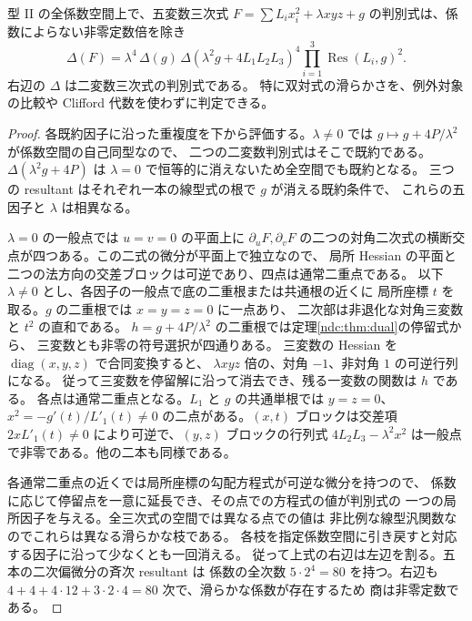 \begin{proposition}[三様体の判別式の引戻し]\label{ndc:prop:discriminant}
型 II の全係数空間上で、五変数三次式 $F=\sum L_i x_i^2+\lambda xyz+g$
の判別式は、係数によらない非零定数倍を除き
\[
 \Delta(F)=\lambda^4\,\Delta(g)\,
       \Delta(\lambda^2 g+4L_1L_2L_3)^4
       \prod_{i=1}^3\operatorname{Res}(L_i,g)^2 .
\]
右辺の $\Delta$ は二変数三次式の判別式である。
特に双対式の滑らかさを、例外対象の比較や Clifford 代数を使わずに判定できる。
\end{proposition}
\begin{proof}
各既約因子に沿った重複度を下から評価する。$\lambda\ne0$ では
$g\mapsto g+4P/\lambda^2$ が係数空間の自己同型なので、
二つの二変数判別式はそこで既約である。$\Delta(\lambda^2g+4P)$ は
$\lambda=0$ で恒等的に消えないため全空間でも既約となる。
三つの resultant はそれぞれ一本の線型式の根で $g$ が消える既約条件で、
これらの五因子と $\lambda$ は相異なる。

$\lambda=0$ の一般点では $u=v=0$ の平面上に $\partial_uF,\partial_vF$
の二つの対角二次式の横断交点が四つある。この二式の微分が平面上で独立なので、
局所 Hessian の平面と二つの法方向の交差ブロックは可逆であり、四点は通常二重点である。
以下 $\lambda\ne0$ とし、各因子の一般点で底の二重根または共通根の近くに
局所座標 $t$ を取る。$g$ の二重根では $x=y=z=0$ に一点あり、
二次部は非退化な対角三変数と $t^2$ の直和である。
$h=g+4P/\lambda^2$ の二重根では定理\ref{ndc:thm:dual}の停留式から、
三変数とも非零の符号選択が四通りある。
三変数の Hessian を $\operatorname{diag}(x,y,z)$ で合同変換すると、
$\lambda xyz$ 倍の、対角 $-1$、非対角 $1$ の可逆行列になる。
従って三変数を停留解に沿って消去でき、残る一変数の関数は $h$ である。
各点は通常二重点となる。$L_1$ と $g$ の共通単根では $y=z=0$、
$x^2=-g'(t)/L'_1(t)\ne0$ の二点がある。$(x,t)$ ブロックは交差項
$2xL'_1(t)\ne0$ により可逆で、$(y,z)$ ブロックの行列式
$4L_2L_3-\lambda^2x^2$ は一般点で非零である。他の二本も同様である。

各通常二重点の近くでは局所座標の勾配方程式が可逆な微分を持つので、
係数に応じて停留点を一意に延長でき、その点での方程式の値が判別式の
一つの局所因子を与える。全三次式の空間では異なる点での値は
非比例な線型汎関数なのでこれらは異なる滑らかな枝である。
各枝を指定係数空間に引き戻すと対応する因子に沿って少なくとも一回消える。
従って上式の右辺は左辺を割る。五本の二次偏微分の斉次 resultant は
係数の全次数 $5\cdot2^4=80$ を持つ。右辺も
$4+4+4\cdot12+3\cdot2\cdot4=80$ 次で、滑らかな係数が存在するため
商は非零定数である。
\end{proof}
